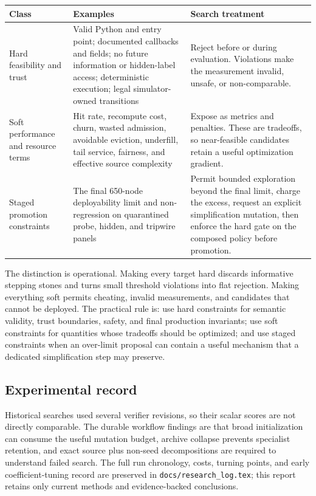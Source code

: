 \documentclass[11pt]{article}
\newcommand{\filepath}[1]{\nolinkurl{#1}}
\begin{document}
\begin{center}
\footnotesize
\begin{tabularx}{\textwidth}{@{}
  >{\raggedright\arraybackslash}p{}
  >{\raggedright\arraybackslash}p{}
  >{\raggedright\arraybackslash}X@{}}
\toprule
\textbf{Class} & \textbf{Examples} & \textbf{Search treatment} \\
\midrule
Hard feasibility and trust &
Valid Python and entry point; documented callbacks and fields; no future information
or hidden-label access; deterministic execution; legal simulator-owned transitions &
Reject before or during evaluation.  Violations make the measurement invalid, unsafe,
or non-comparable. \\
Soft performance and resource terms &
Hit rate, recompute cost, churn, wasted admission, avoidable eviction, underfill,
tail service, fairness, and effective source complexity &
Expose as metrics and penalties.  These are tradeoffs, so near-feasible candidates
retain a useful optimization gradient. \\
Staged promotion constraints &
The final 650-node deployability limit and non-regression on quarantined probe,
hidden, and tripwire panels &
Permit bounded exploration beyond the final limit, charge the excess, request an
explicit simplification mutation, then enforce the hard gate on the composed policy
before promotion. \\
\bottomrule
\end{tabularx}
\end{center}

The distinction is operational.  Making every target hard discards informative
stepping stones and turns small threshold violations into flat rejection.  Making
everything soft permits cheating, invalid measurements, and candidates that cannot be
deployed.  The practical rule is: use hard constraints for semantic validity, trust
boundaries, safety, and final production invariants; use soft constraints for
quantities whose tradeoffs should be optimized; and use staged constraints when an
over-limit proposal can contain a useful mechanism that a dedicated simplification
step may preserve.

\subsection{Experimental record}

Historical searches used several verifier revisions, so their scalar scores are not
directly comparable.  The durable workflow findings are that broad initialization can
consume the useful mutation budget, archive collapse prevents specialist retention,
and exact source plus non-seed decompositions are required to understand failed search.
The full run chronology, costs, turning points, and early coefficient-tuning record are
preserved in \filepath{docs/research_log.tex}; this report retains only current methods
and evidence-backed conclusions.
\end{document}
